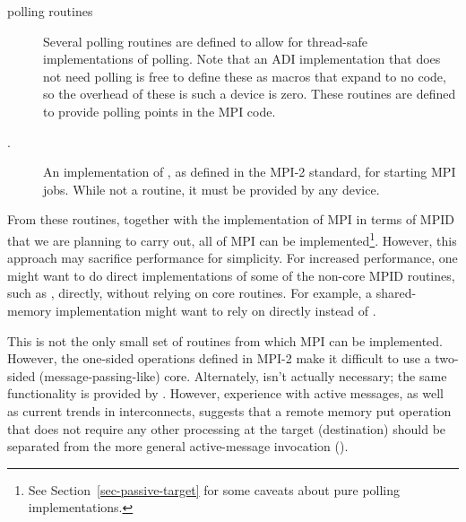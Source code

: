 \documentclass[dvipdfm]{article}
\begin{document}
\begin{description}

\item[polling routines]Several polling routines are defined to allow
for thread-safe implementations of polling.  Note that an ADI
implementation that does not need polling is free to define these as
macros that expand to no code, so the overhead of these is such a
device is zero.  These routines are defined to provide polling points
in the MPI code.


\item[.] An implementation of , as defined in the
  MPI-2 standard, for starting MPI jobs.  While not a routine, it must be 
  provided by any device.  
\end{description}
From these routines, together with the implementation of MPI in terms of MPID
that we are planning to carry out, all of MPI can be implemented\footnote{See
Section~\ref{sec-passive-target} for some caveats about pure polling
implementations.}.  However, this approach may sacrifice performance
for simplicity.  For increased performance, one might want to do direct
implementations of some of the non-core MPID routines, such as
, directly, without relying on core routines.  For example, a
shared-memory implementation might want to rely on  directly
instead of .

This is not the only small set of routines from which MPI can be
implemented.  However, the one-sided operations defined in MPI-2 make
it difficult to use a two-sided (message-passing-like) core.
Alternately,  isn't actually necessary; the same
functionality is provided by .  However, experience
with active messages, as well as current trends in interconnects,
suggests that a remote memory put operation that does not require any
other processing at the target (destination) should be separated from
the more general active-message invocation ().
\end{document}
